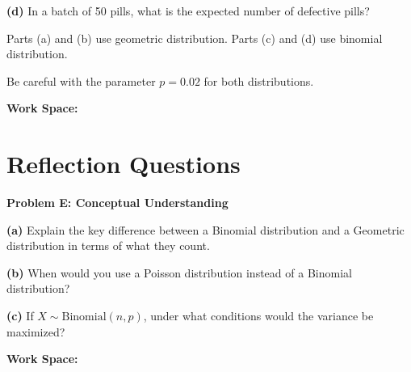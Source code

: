 \documentclass[
  11pt,
]{article}
\begin{document}
\textbf{(d)} In a batch of 50 pills, what is the expected number of
defective pills?

\begin{tcolorbox}[enhanced jigsaw, coltitle=black, colback=white, titlerule=0mm, left=2mm, opacityback=0, bottomtitle=1mm, title=\textcolor{quarto-callout-tip-color}{\faLightbulb}\hspace{0.5em}{Tip}, colframe=quarto-callout-tip-color-frame, toptitle=1mm, arc=.35mm, leftrule=.75mm, toprule=.15mm, bottomrule=.15mm, breakable, rightrule=.15mm, colbacktitle=quarto-callout-tip-color!10!white, opacitybacktitle=0.6]

Parts (a) and (b) use geometric distribution. Parts (c) and (d) use
binomial distribution.

Be careful with the parameter \(p = 0.02\) for both distributions.

\end{tcolorbox}

\textbf{Work Space:}

\section{Reflection Questions}\label{reflection-questions}

\textbf{Problem E: Conceptual Understanding}

\textbf{(a)} Explain the key difference between a Binomial distribution
and a Geometric distribution in terms of what they count.

\textbf{(b)} When would you use a Poisson distribution instead of a
Binomial distribution?

\textbf{(c)} If \(X \sim \text{Binomial}(n, p)\), under what conditions
would the variance be maximized?

\textbf{Work Space:}
\end{document}
